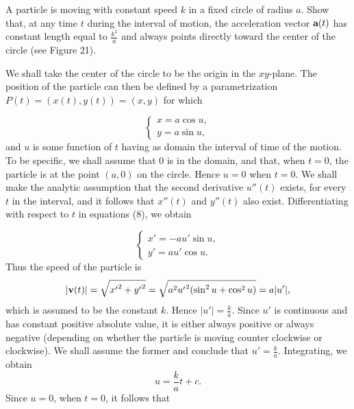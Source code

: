 \begin{example}
A particle is moving with constant speed $k$ in a fixed circle of radius $a$. Show that, at any time $t$ during the interval of motion, the acceleration
vector $\mbox{\bf{a}}(t)$ has constant length equal to $\frac{k^2}{a}$ and always points directly toward the center of the circle (see Figure 21).
  

We shall take the center of the circle to be the origin in the $xy$-plane. The position of the particle can then be defined by a parametrization $P(t) = (x(t), y(t)) = (x, y)$ for which

\begin{equation}
\left \{ \begin{array}{l}
x = a \cos u, \\
y = a \sin u,
\end{array}
\right .
\label{eq10.5.8}
\end{equation}
and $u$ is some function of $t$ having as domain the interval of time of the motion. To be specific, we shall assume that 0 is in the domain, and that, when $t = 0$, the particle is at the point $(a, 0)$ on the circle. Hence $u = 0$ when $t = 0$. We shall make the analytic assumption that the second derivative $u''(t)$ exists, for every $t$ in the interval, and it follows that $x''(t)$ and $y''(t)$ also exist. Differentiating with respect to $t$ in equations (8), we obtain

\begin{equation}
\left \{ \begin{array}{l}
x' = -au' \sin u, \\
y' = au' \cos u.
\end{array}
\right .
\label{eq10.5.9}
\end{equation}
Thus the speed of the particle is 
$$
|\mbox{\bf{v}}(t)| = \sqrt{{x'}^2 + {y'}^2} = \sqrt{a^2{u'}^2(\sin^2 u + \cos^2 u)} = a|u'|, 
$$
which is assumed to be the constant $k$. Hence $|u'| = \frac{k}{a}$. Since $u'$ is continuous and has constant positive absolute value, it is either always positive or always negative (depending on whether the particle is moving counter
clockwise or clockwise). We shall assume the former and conclude that $u' = \frac{k}{a}$. Integrating, we obtain
$$
u = \frac{k}{a} t + c.  
$$
Since $u = 0$, when $t = 0$, it follows that 


\end{example}
